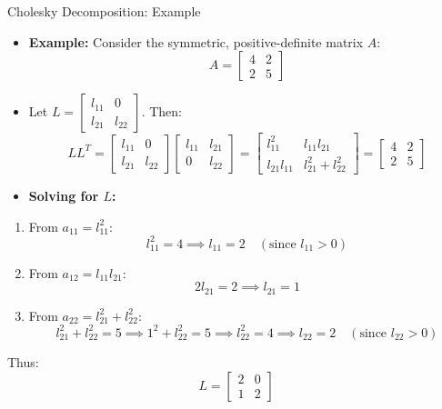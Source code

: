 \begin{frame}{Cholesky Decomposition: Example}
\begin{itemize}
    \item \textbf{Example:} Consider the symmetric, positive-definite matrix $A$:
    \[
    A = \begin{bmatrix}
    4 & 2 \\
    2 & 5
    \end{bmatrix}
    \]
    
    \item Let $L = \begin{bmatrix} l_{11} & 0 \\ l_{21} & l_{22} \end{bmatrix}$. Then:
    \[
    L L^T = \begin{bmatrix}
    l_{11} & 0 \\
    l_{21} & l_{22}
    \end{bmatrix} \begin{bmatrix}
    l_{11} & l_{21} \\
    0 & l_{22}
    \end{bmatrix} = \begin{bmatrix}
    l_{11}^2 & l_{11} l_{21} \\
    l_{21} l_{11} & l_{21}^2 + l_{22}^2
    \end{bmatrix} = \begin{bmatrix}
    4 & 2 \\
    2 & 5
    \end{bmatrix}
    \]
    
    \item \textbf{Solving for $L$:}
\end{itemize} 
\end{frame}

\begin{frame}{}
\begin{enumerate}
    \item From \( a_{11} = l_{11}^2 \):
    \[
    l_{11}^2 = 4 \implies l_{11} = 2 \quad (\text{since } l_{11} > 0)
    \]

    \item From \( a_{12} = l_{11} l_{21} \):
    \[
    2 l_{21} = 2 \implies l_{21} = 1
    \]

    \item From \( a_{22} = l_{21}^2 + l_{22}^2 \):
    \[
    l_{21}^2 + l_{22}^2 = 5 \implies 1^2 + l_{22}^2 = 5 \implies l_{22}^2 = 4 \implies l_{22} = 2 \quad (\text{since } l_{22} > 0)
    \]
\end{enumerate}
Thus:
\[
L = \begin{bmatrix}
2 & 0 \\
1 & 2
\end{bmatrix}
\]
\end{frame}